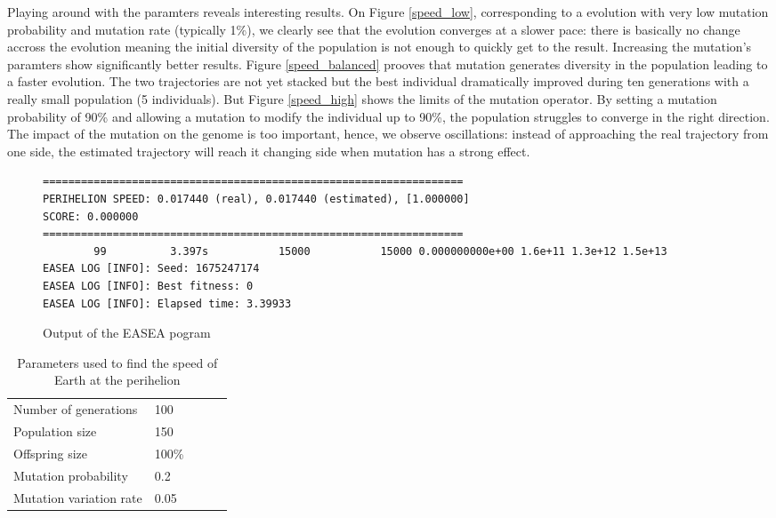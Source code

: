 Playing around with the paramters reveals interesting results. On Figure
\ref{speed_low}, corresponding to a evolution with very low mutation
probability and mutation rate (typically 1\%), we clearly see that the evolution
converges at a slower pace: there is basically no change accross the evolution
meaning the initial diversity of the population is not enough to quickly get to
the result. Increasing the mutation's paramters show significantly better
results. Figure \ref{speed_balanced} prooves that mutation generates diversity
in the population leading to a faster evolution. The two trajectories are not
yet stacked but the best individual dramatically improved during ten
generations with a really small population (5 individuals). But Figure
\ref{speed_high} shows the limits of the mutation operator. By setting a
mutation probability of 90\% and allowing a mutation to modify the individual
up to 90\%, the population struggles to converge in the right direction. The
impact of the mutation on the genome is too important, hence, we observe
oscillations: instead of approaching the real trajectory from one side, the
estimated trajectory will reach it changing side when mutation has a strong
effect.

\begin{figure}
    \begin{lstlisting}
==================================================================
PERIHELION SPEED: 0.017440 (real), 0.017440 (estimated), [1.000000]
SCORE: 0.000000
==================================================================
        99          3.397s           15000           15000 0.000000000e+00 1.6e+11 1.3e+12 1.5e+13
EASEA LOG [INFO]: Seed: 1675247174
EASEA LOG [INFO]: Best fitness: 0
EASEA LOG [INFO]: Elapsed time: 3.39933
\end{lstlisting}
    \caption{Output of the EASEA pogram}
    \label{speed_1}
\end{figure}

\begin{table}
    \begin{tabular}{lllll}
        Number of generations   & 100   \\
        Population size         & 150   \\
        Offspring size          & 100\% \\
        Mutation probability    & 0.2   \\
        Mutation variation rate & 0.05
    \end{tabular}
    \caption{Parameters used to find the speed of Earth at the perihelion}
    \label{speed_table}
\end{table}

